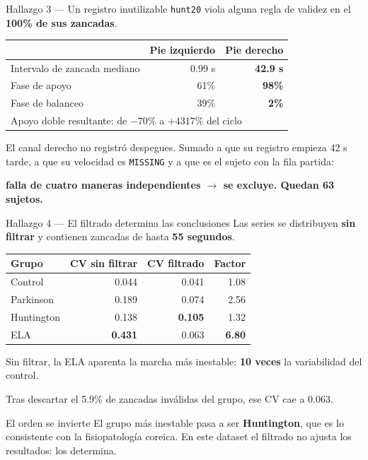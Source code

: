 \documentclass[aspectratio=169,10pt]{beamer}
\begin{document}
\begin{frame}{Hallazgo 3 — Un registro inutilizable}
  \texttt{hunt20} viola alguna regla de validez en el \textbf{100\% de sus zancadas}.

  \vspace{1em}
  \centering
  \begin{tabular}{lrr}
    \toprule
    & Pie izquierdo & Pie derecho \\
    \midrule
    Intervalo de zancada mediano & 0.99 s & \textbf{42.9 s} \\
    Fase de apoyo & 61\% & \textbf{98\%} \\
    Fase de balanceo & 39\% & \textbf{2\%} \\
    \midrule
    \multicolumn{3}{l}{Apoyo doble resultante: de $-70\%$ a $+4317\%$ del ciclo} \\
    \bottomrule
  \end{tabular}

  \vspace{1.2em}
  \raggedright
  El canal derecho no registró despegues. Sumado a que su registro empieza 42 s tarde, a que su velocidad es \texttt{MISSING} y a que es el sujeto con la fila partida:

  \vspace{0.5em}
  \centering
  \textbf{falla de cuatro maneras independientes $\rightarrow$ se excluye. Quedan 63 sujetos.}
\end{frame}

\begin{frame}{Hallazgo 4 — El filtrado determina las conclusiones}
  Las series se distribuyen \textbf{sin filtrar} y contienen zancadas de hasta \textbf{55 segundos}.

  \vspace{1em}
  \centering
  \begin{tabular}{lrrr}
    \toprule
    Grupo & CV sin filtrar & CV filtrado & Factor \\
    \midrule
    \color{control}Control    & 0.044 & 0.041 & 1.08 \\
    \color{park}Parkinson  & 0.189 & 0.074 & 2.56 \\
    \color{hunt}Huntington & 0.138 & \textbf{0.105} & 1.32 \\
    \color{als}ELA        & \textbf{0.431} & 0.063 & \textbf{6.80} \\
    \bottomrule
  \end{tabular}

  \vspace{1.2em}
  \raggedright
  Sin filtrar, la ELA aparenta la marcha más inestable: \textbf{10 veces} la variabilidad del control.

  \vspace{0.5em}
  Tras descartar el 5.9\% de zancadas inválidas del grupo, ese CV cae a 0.063.

  \vspace{0.8em}
  \begin{block}{El orden se invierte}
    El grupo más inestable pasa a ser \textbf{\color{hunt}Huntington}, que es lo consistente con la fisiopatología coreica. En este dataset el filtrado no ajusta los resultados: los determina.
  \end{block}
\end{frame}
\end{document}
